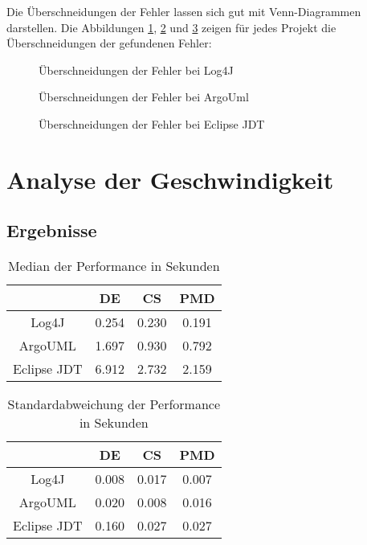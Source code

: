 Die Überschneidungen der Fehler lassen sich gut mit Venn-Diagrammen darstellen.  Die Abbildungen \ref{fig:log4j_venn}, \ref{fig:argo_venn} und  \ref{fig:eclipse_venn} zeigen für jedes Projekt die Überschneidungen der gefundenen Fehler:



\begin{figure}
    \centering

    \caption{Überschneidungen der Fehler bei Log4J}
    \label{fig:log4j_venn}
\end{figure}

\begin{figure}
    \centering

    \caption{Überschneidungen der Fehler bei ArgoUml}
    \label{fig:argo_venn}
\end{figure}
\begin{figure}
    \centering

    \caption{Überschneidungen der Fehler bei Eclipse JDT}
    \label{fig:eclipse_venn}
\end{figure}

\clearpage
 \section{Analyse der Geschwindigkeit}
 \subsection{Ergebnisse}
 \begin{table}[]
     \centering
     \begin{tabular}{c|c|c|c}
        & DE & CS & PMD  \\\hline
        Log4J & 0.254 & 0.230 & 0.191\\\hline 
        ArgoUML & 1.697 & 0.930 & 0.792 \\\hline
        Eclipse JDT & 6.912 & 2.732 & 2.159
     \end{tabular}
     \caption{Median der Performance in Sekunden}
     \label{tab:median_speed}
 \end{table}
 
  \begin{table}[]
     \centering
     \begin{tabular}{c|c|c|c}
        & DE & CS & PMD  \\\hline
        Log4J & 0.008 & 0.017 & 0.007\\\hline 
        ArgoUML & 0.020 & 0.008 & 0.016 \\\hline
        Eclipse JDT & 0.160 & 0.027 & 0.027
     \end{tabular}
     \caption{Standardabweichung der Performance in Sekunden}
     \label{tab:median_speed}
 \end{table}
 
